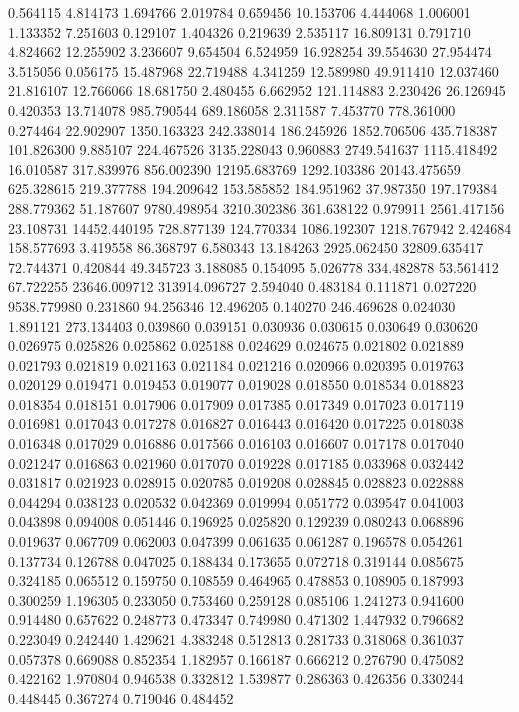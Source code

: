 0.564115
4.814173
1.694766
2.019784
0.659456
10.153706
4.444068
1.006001
1.133352
7.251603
0.129107
1.404326
0.219639
2.535117
16.809131
0.791710
4.824662
12.255902
3.236607
9.654504
6.524959
16.928254
39.554630
27.954474
3.515056
0.056175
15.487968
22.719488
4.341259
12.589980
49.911410
12.037460
21.816107
12.766066
18.681750
2.480455
6.662952
121.114883
2.230426
26.126945
0.420353
13.714078
985.790544
689.186058
2.311587
7.453770
778.361000
0.274464
22.902907
1350.163323
242.338014
186.245926
1852.706506
435.718387
101.826300
9.885107
224.467526
3135.228043
0.960883
2749.541637
1115.418492
16.010587
317.839976
856.002390
12195.683769
1292.103386
20143.475659
625.328615
219.377788
194.209642
153.585852
184.951962
37.987350
197.179384
288.779362
51.187607
9780.498954
3210.302386
361.638122
0.979911
2561.417156
23.108731
14452.440195
728.877139
124.770334
1086.192307
1218.767942
2.424684
158.577693
3.419558
86.368797
6.580343
13.184263
2925.062450
32809.635417
72.744371
0.420844
49.345723
3.188085
0.154095
5.026778
334.482878
53.561412
67.722255
23646.009712
313914.096727
2.594040
0.483184
0.111871
0.027220
9538.779980
0.231860
94.256346
12.496205
0.140270
246.469628
0.024030
1.891121
273.134403
0.039860
0.039151
0.030936
0.030615
0.030649
0.030620
0.026975
0.025826
0.025862
0.025188
0.024629
0.024675
0.021802
0.021889
0.021793
0.021819
0.021163
0.021184
0.021216
0.020966
0.020395
0.019763
0.020129
0.019471
0.019453
0.019077
0.019028
0.018550
0.018534
0.018823
0.018354
0.018151
0.017906
0.017909
0.017385
0.017349
0.017023
0.017119
0.016981
0.017043
0.017278
0.016827
0.016443
0.016420
0.017225
0.018038
0.016348
0.017029
0.016886
0.017566
0.016103
0.016607
0.017178
0.017040
0.021247
0.016863
0.021960
0.017070
0.019228
0.017185
0.033968
0.032442
0.031817
0.021923
0.028915
0.020785
0.019208
0.028845
0.028823
0.022888
0.044294
0.038123
0.020532
0.042369
0.019994
0.051772
0.039547
0.041003
0.043898
0.094008
0.051446
0.196925
0.025820
0.129239
0.080243
0.068896
0.019637
0.067709
0.062003
0.047399
0.061635
0.061287
0.196578
0.054261
0.137734
0.126788
0.047025
0.188434
0.173655
0.072718
0.319144
0.085675
0.324185
0.065512
0.159750
0.108559
0.464965
0.478853
0.108905
0.187993
0.300259
1.196305
0.233050
0.753460
0.259128
0.085106
1.241273
0.941600
0.914480
0.657622
0.248773
0.473347
0.749980
0.471302
1.447932
0.796682
0.223049
0.242440
1.429621
4.383248
0.512813
0.281733
0.318068
0.361037
0.057378
0.669088
0.852354
1.182957
0.166187
0.666212
0.276790
0.475082
0.422162
1.970804
0.946538
0.332812
1.539877
0.286363
0.426356
0.330244
0.448445
0.367274
0.719046
0.484452
